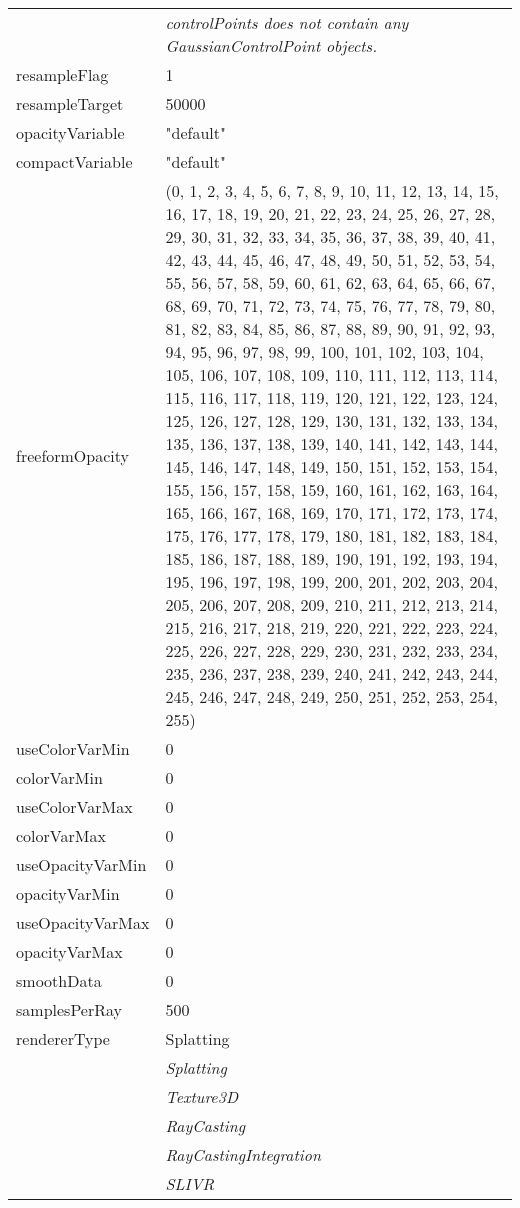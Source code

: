 \documentclass[10pt,a4paper]{report}
\begin{document}
\begin{longtable}{lp{7.5cm}}
 & {\it controlPoints does not contain any GaussianControlPoint objects.} \\
resampleFlag  &  1 \\
resampleTarget  &  50000 \\
opacityVariable  &  "default" \\
compactVariable  &  "default" \\
freeformOpacity  &  (0, 1, 2, 3, 4, 5, 6, 7, 8, 9, 10, 11, 12, 13, 14, 15, 16, 17, 18, 19, 20, 21, 22, 23, 24, 25, 26, 27, 28, 29, 30, 31, 32, 33, 34, 35, 36, 37, 38, 39, 40, 41, 42, 43, 44, 45, 46, 47, 48, 49, 50, 51, 52, 53, 54, 55, 56, 57, 58, 59, 60, 61, 62, 63, 64, 65, 66, 67, 68, 69, 70, 71, 72, 73, 74, 75, 76, 77, 78, 79, 80, 81, 82, 83, 84, 85, 86, 87, 88, 89, 90, 91, 92, 93, 94, 95, 96, 97, 98, 99, 100, 101, 102, 103, 104, 105, 106, 107, 108, 109, 110, 111, 112, 113, 114, 115, 116, 117, 118, 119, 120, 121, 122, 123, 124, 125, 126, 127, 128, 129, 130, 131, 132, 133, 134, 135, 136, 137, 138, 139, 140, 141, 142, 143, 144, 145, 146, 147, 148, 149, 150, 151, 152, 153, 154, 155, 156, 157, 158, 159, 160, 161, 162, 163, 164, 165, 166, 167, 168, 169, 170, 171, 172, 173, 174, 175, 176, 177, 178, 179, 180, 181, 182, 183, 184, 185, 186, 187, 188, 189, 190, 191, 192, 193, 194, 195, 196, 197, 198, 199, 200, 201, 202, 203, 204, 205, 206, 207, 208, 209, 210, 211, 212, 213, 214, 215, 216, 217, 218, 219, 220, 221, 222, 223, 224, 225, 226, 227, 228, 229, 230, 231, 232, 233, 234, 235, 236, 237, 238, 239, 240, 241, 242, 243, 244, 245, 246, 247, 248, 249, 250, 251, 252, 253, 254, 255) \\
useColorVarMin  &  0 \\
colorVarMin  &  0 \\
useColorVarMax  &  0 \\
colorVarMax  &  0 \\
useOpacityVarMin  &  0 \\
opacityVarMin  &  0 \\
useOpacityVarMax  &  0 \\
opacityVarMax  &  0 \\
smoothData  &  0 \\
samplesPerRay  &  500 \\
rendererType  &  Splatting   \\
 & {\it  Splatting} \\
 & {\it  Texture3D} \\
 & {\it  RayCasting} \\
 & {\it  RayCastingIntegration} \\
 & {\it  SLIVR} \\

\end{longtable}
\end{document}
